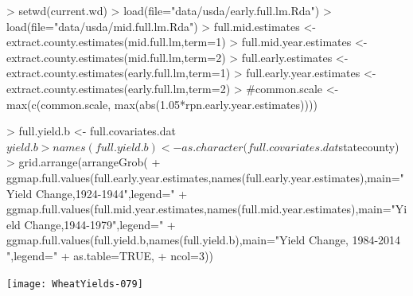 \documentclass{report}
\begin{document}
\begin{Schunk}
\begin{Sinput}
> setwd(current.wd)
> load(file="data/usda/early.full.lm.Rda")
> load(file="data/usda/mid.full.lm.Rda")
> full.mid.estimates <- extract.county.estimates(mid.full.lm,term=1)
> full.mid.year.estimates <- extract.county.estimates(mid.full.lm,term=2)
> full.early.estimates <- extract.county.estimates(early.full.lm,term=1)
> full.early.year.estimates <- extract.county.estimates(early.full.lm,term=2)
> #common.scale <- max(c(common.scale, max(abs(1.05*rpn.early.year.estimates))))
\end{Sinput}
\end{Schunk}



\begin{Schunk}
\begin{Sinput}
> full.yield.b <- full.covariates.dat$yield.b
> names(full.yield.b) <- as.character(full.covariates.dat$statecounty)
> grid.arrange(arrangeGrob(
+    ggmap.full.values(full.early.year.estimates,names(full.early.year.estimates),main="Yield Change,1924-1944",legend="%
+    ggmap.full.values(full.mid.year.estimates,names(full.mid.year.estimates),main="Yield Change,1944-1979",legend="%
+    ggmap.full.values(full.yield.b,names(full.yield.b),main="Yield Change, 1984-2014 ",legend="%
+    as.table=TRUE,
+    ncol=3))
\end{Sinput}
\end{Schunk}
\texttt{[image: WheatYields-079]}
\end{document}
